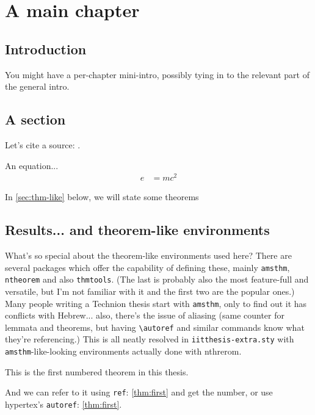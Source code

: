 
\chapter{A main chapter}
\label{chap:firstchap}

\section{Introduction}

You might have a per-chapter mini-intro, possibly tying in to the relevant part of the general intro.

\section{A section}

\lipsum[1]

Let's cite a source: \cite{Yao1977}.

An equation...
\begin{align}
\label{eq:emc2}
e &= mc^2
\end{align}

In \autoref{sec:thm-like} below, we will state some theorems

\section{Results... and theorem-like environments}
\label{sec:thm-like}

What's so special about the theorem-like environments used here? There are several packages which offer the capability of defining these, mainly \texttt{amsthm}, \texttt{ntheorem} and also \texttt{thmtools}. (The last is probably also the most feature-full and versatile, but I'm not familiar with it and the first two are the popular ones.) Many people writing a Technion thesis start with \texttt{amsthm}, only to find out it has conflicts with Hebrew... also, there's the issue of aliasing (same counter for lemmata and theorems, but having \texttt{{\textbackslash}autoref} and similar commands know what they're referencing.) This is all neatly resolved in \texttt{iitthesis-extra.sty} with \texttt{amsthm}-like-looking environments actually done with nthrerom.

\begin{theorem}
\label{thm:first}
This is the first numbered theorem in this thesis.
\end{theorem}

And we can refer to it using \texttt{ref}: \ref{thm:first} and get the number, or use hypertex's \texttt{autoref}: \autoref{thm:first}.

